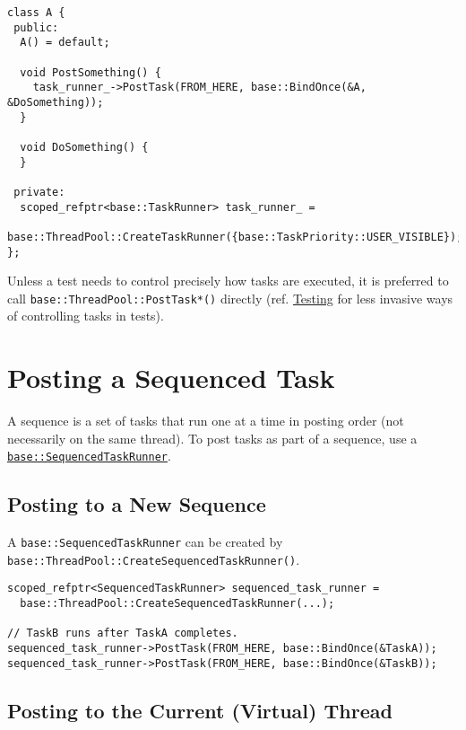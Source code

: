 \documentclass[a4paper,12pt,notitlepage,twoside,openright]{article}
\begin{document}
\begin{verbatim}
class A {
 public:
  A() = default;

  void PostSomething() {
    task_runner_->PostTask(FROM_HERE, base::BindOnce(&A, &DoSomething));
  }

  void DoSomething() {
  }

 private:
  scoped_refptr<base::TaskRunner> task_runner_ =
      base::ThreadPool::CreateTaskRunner({base::TaskPriority::USER_VISIBLE});
};
\end{verbatim}

Unless a test needs to control precisely how tasks are executed, it is
preferred to call \texttt{base::ThreadPool::PostTask*()} directly (ref.
\protect\hyperlink{Testing}{Testing} for less invasive ways of
controlling tasks in tests).

\hypertarget{posting-a-sequenced-task}{%
\section{Posting a Sequenced Task}\label{posting-a-sequenced-task}}

A sequence is a set of tasks that run one at a time in posting order
(not necessarily on the same thread). To post tasks as part of a
sequence, use a
\href{https://cs.chromium.org/chromium/src/base/sequenced_task_runner.h}{\texttt{base::SequencedTaskRunner}}.

\hypertarget{posting-to-a-new-sequence}{%
\subsection{Posting to a New
Sequence}\label{posting-to-a-new-sequence}}

A \texttt{base::SequencedTaskRunner} can be created by
\texttt{base::ThreadPool::CreateSequencedTaskRunner()}.

\begin{verbatim}
scoped_refptr<SequencedTaskRunner> sequenced_task_runner =
  base::ThreadPool::CreateSequencedTaskRunner(...);

// TaskB runs after TaskA completes.
sequenced_task_runner->PostTask(FROM_HERE, base::BindOnce(&TaskA));
sequenced_task_runner->PostTask(FROM_HERE, base::BindOnce(&TaskB));
\end{verbatim}

\hypertarget{posting-to-the-current-virtual-thread}{%
\subsection{Posting to the Current (Virtual)
Thread}\label{posting-to-the-current-virtual-thread}}
\end{document}
